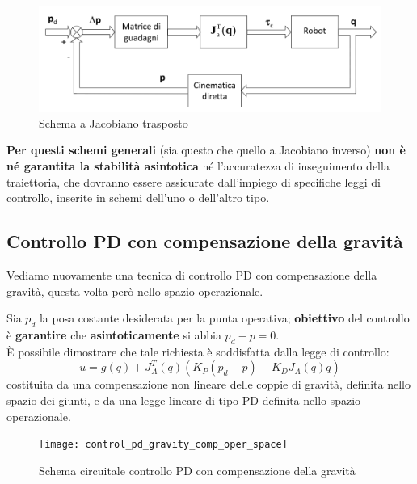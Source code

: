 \begin{figure}[H]
	\centering
	\includegraphics[width=0.7\linewidth]{images/operational_space_control_jac_trasp}
	\caption{Schema a Jacobiano trasposto}
	\label{fig:operationalspacecontroljactrasp}
\end{figure}


\textbf{Per questi schemi generali} (sia questo che quello a Jacobiano inverso) \textbf{non è né garantita la stabilità asintotica} né l’accuratezza di inseguimento della traiettoria, che dovranno essere assicurate dall’impiego di specifiche leggi di controllo, inserite in schemi dell’uno o dell’altro tipo.






\subsection{Controllo PD con compensazione della gravità}\label{section:pd_control_gravity_comp_join_space}
Vediamo nuovamente una tecnica di controllo PD con compensazione della gravità, questa volta però nello spazio operazionale.

Sia $p_d$ la posa costante desiderata per la punta operativa; \textbf{obiettivo} del controllo è \textbf{garantire} che \textbf{asintoticamente} si abbia $p_d - p = 0$.\\
È possibile dimostrare che tale richiesta è soddisfatta dalla legge di controllo:
\begin{equation}\label{eq:pd_gravity_comp_control_operational}
u = g(q) + J_A^T(q)(K_P(p_d - p) - K_DJ_A(q)\dot{q})
\end{equation}
costituita da una compensazione non lineare delle coppie di gravità, definita nello spazio dei giunti, e da una legge lineare di tipo PD definita nello spazio operazionale.


\begin{figure}[H]
	\centering
	\texttt{[image: control\_pd\_gravity\_comp\_oper\_space]}
	\caption{Schema circuitale controllo PD con compensazione della gravità}
	\label{fig:controlpdgravitycompoperspace}
\end{figure}


\vspace*{5pt}

